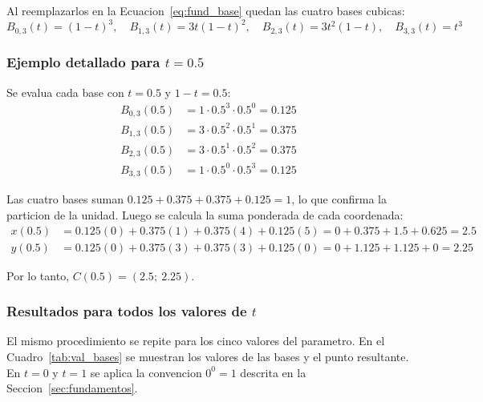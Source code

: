 Al reemplazarlos en la Ecuacion~\ref{eq:fund_base} quedan las cuatro bases cubicas:
\begin{equation}
\label{eq:val_bases_cubicas}
B_{0,3}(t) = (1-t)^3, \quad B_{1,3}(t) = 3t(1-t)^2, \quad B_{2,3}(t) = 3t^2(1-t), \quad B_{3,3}(t) = t^3
\end{equation}

\subsubsection{Ejemplo detallado para $t = 0.5$}

Se evalua cada base con $t = 0.5$ y $1 - t = 0.5$:
\begin{align}
B_{0,3}(0.5) & = 1 \cdot 0.5^3 \cdot 0.5^0 = 0.125 \nonumber \\
B_{1,3}(0.5) & = 3 \cdot 0.5^2 \cdot 0.5^1 = 0.375 \nonumber \\
B_{2,3}(0.5) & = 3 \cdot 0.5^1 \cdot 0.5^2 = 0.375 \nonumber \\
B_{3,3}(0.5) &= 1 \cdot 0.5^0 \cdot 0.5^3 = 0.125 \label{eq:val_bases_t05}
\end{align}

Las cuatro bases suman $0.125 + 0.375 + 0.375 + 0.125 = 1$, lo que confirma la particion de la unidad. Luego se calcula la suma ponderada de cada coordenada:
\begin{align}
x(0.5) & = 0.125(0) + 0.375(1) + 0.375(4) + 0.125(5) = 0 + 0.375 + 1.5 + 0.625 = 2.5 \nonumber \\
y(0.5) &= 0.125(0) + 0.375(3) + 0.375(3) + 0.125(0) = 0 + 1.125 + 1.125 + 0 = 2.25 \label{eq:val_bernstein_t05}
\end{align}

Por lo tanto, $C(0.5) = (2.5;\ 2.25)$.

\subsubsection{Resultados para todos los valores de $t$}

El mismo procedimiento se repite para los cinco valores del parametro. En el Cuadro~\ref{tab:val_bases} se muestran los valores de las bases y el punto resultante. En $t = 0$ y $t = 1$ se aplica la convencion $0^0 = 1$ descrita en la Seccion~\ref{sec:fundamentos}.

